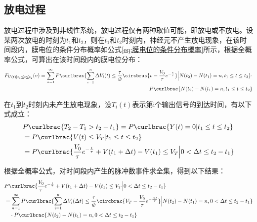 \documentclass[11pt]{article}
\begin{document}
\subsection{放电过程}
放电过程中涉及到非线性系统，放电过程仅有两种取值可能，即放电或不放电。设某两次放电的时刻为$t_1$和$t_2$，则在$t_1$和$t_2$时刻内，神经元不产生放电现象，在该时间段内，膜电位的条件分布概率如公式\ref{eq:膜电位的条件分布概率}所示，根据全概率公式，可算出在该时间段内的膜电位分布：
\begin{align}
  \begin{aligned}
    F_{V(t)|t_1\le t\le t_2}(v)=    \sum_{n=1}^{\infty}P\curlbrac{\sum_{i=1}^{n}\Delta V_i(t)\le \frac{\tau}{\tilde{w}}\circbrac{v-\frac{V_0}{\tau}e^{-\frac{t}{\tau}}}\Big| N(t_2)-N(t_1)=n,t_1\le t\le t_2}\cdot \\
    P\curlbrac{ N(t_2)-N(t_1)=n,t_1\le t\le t_2}
  \end{aligned}
\end{align}\par
在$t_1$到$t_2$时刻内未产生放电现象，设$T_i(t)$表示第i个输出信号的到达时间，有以下式成立：
\begin{align*}
   & P\curlbrac{T_2-T_{1}>t_2-t_1}=P\curlbrac{Y(t)=0|t_1\le t\le t_2}                                          \\
   & =  P\curlbrac{V(t)\le V_T|t_1\le t\le t_2}                                                                \\
   & = P\curlbrac{\frac{V_0}{\tau}e^{-\frac{t}{\tau}}+V(t_1+\Delta t)-V(t_1)\le V_T\Big|0<\Delta t\le t_2-t_1}
\end{align*}\par
根据全概率公式，对时间段内产生的脉冲数事件求全集，得到以下结果：
\begin{align}
  \begin{aligned}
     & P\curlbrac{\frac{V_0}{\tau}e^{-\frac{t}{\tau}}+V(t_1+\Delta t)-V(t_1)\le V_T\Big|0<\Delta t\le t_2-t_1}                                                                                          \\
     & =\sum_{n=1}^{\infty}P\curlbrac{\sum_{i=1}^{n}\Delta V_i(\Delta t)\le \frac{\tau}{\tilde{w}}\circbrac{V_T-\frac{V_0}{\tau}e^{-\frac{\Delta t}{\tau}}}\Big| N(t_2)-N(t_1)=n,0<\Delta t\le t_2-t_1} \\
     & \quad\cdot  P\curlbrac{ N(t_2)-N(t_1)=n,0<\Delta t\le t_2-t_1}
  \end{aligned}
  \label{eq:放电过程等价事件全集}
\end{align}\par
\end{document}
